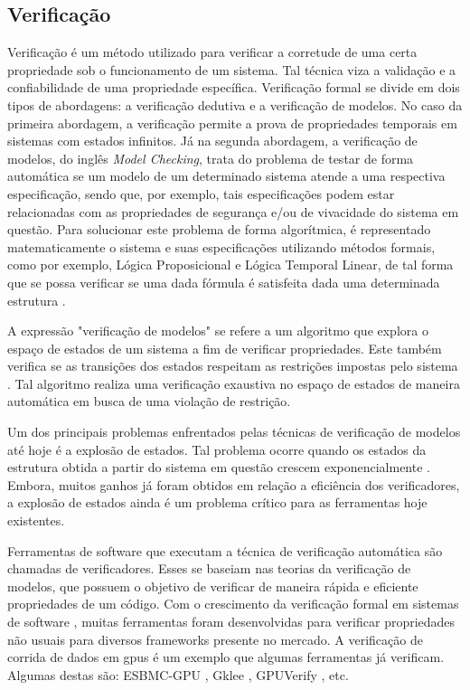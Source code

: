 \subsection{Verificação}
Verificação é um método utilizado para verificar a corretude de uma certa propriedade sob o funcionamento de um sistema. Tal técnica viza a validação e a confiabilidade de uma propriedade específica. Verificação formal se divide em dois tipos de abordagens: a verificação dedutiva e a verificação de modelos. No caso da primeira abordagem, a verificação permite a prova de propriedades temporais em sistemas com estados infinitos. Já na segunda abordagem, a verificação de modelos, do inglês \textit{Model Checking}, trata do problema de testar de forma automática se um modelo de um determinado sistema atende a uma respectiva especificação, sendo que, por exemplo, tais especificações podem estar relacionadas com as propriedades de segurança e/ou de vivacidade do sistema em questão. Para solucionar este problema de forma algorítmica, é representado matematicamente o sistema e suas especificações utilizando métodos formais, como por exemplo, Lógica Proposicional e Lógica Temporal Linear, de tal forma que se possa verificar se uma dada fórmula é satisfeita dada uma determinada estrutura \cite{jhala2009}.

A expressão "verificação de modelos"  se refere a um algoritmo que explora o espaço de estados de um sistema a fim de verificar propriedades. Este também verifica se as transições dos estados respeitam as restrições impostas pelo sistema \cite{clarke2001}.  Tal algoritmo realiza uma verificação exaustiva no espaço de estados de maneira automática em busca de uma violação de restrição.


Um dos principais problemas enfrentados pelas técnicas de verificação de modelos até hoje é a explosão de estados. Tal problema ocorre quando os estados da estrutura obtida a partir do sistema em questão crescem exponencialmente \cite{clarke2001}. Embora, muitos ganhos já foram obtidos em relação a eficiência dos verificadores, a explosão de estados ainda é um problema crítico para as ferramentas hoje existentes.


Ferramentas de software que executam a técnica de verificação automática são chamadas de verificadores. Esses se baseiam nas teorias da verificação de modelos, que possuem o objetivo de verificar de maneira rápida e eficiente propriedades de um código. Com o crescimento da verificação formal em sistemas de software , muitas ferramentas foram desenvolvidas para verificar propriedades não usuais para diversos frameworks presente no mercado. A verificação de corrida de dados em gpus é um exemplo que algumas ferramentas já verificam. Algumas destas são: ESBMC-GPU \cite{monteiro2018}, Gklee \cite{gklee}, GPUVerify \cite{gpuverify}, etc. 


